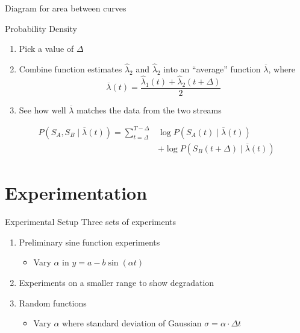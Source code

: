 \documentclass{beamer}
\begin{document}
\begin{frame}
  \begin{center}
    Diagram for area between curves
  \end{center}
\end{frame}

\begin{frame}{Probability Density}
  \begin{enumerate}
  \item Pick a value of $\Delta$
  \item Combine function estimates $\hat{\lambda}_2$ and $\hat{\lambda}_2$ into
    an ``average'' function $\overline{\lambda}$, where
    \[\overline{\lambda}(t)=\frac{\hat{\lambda}_1(t)+\hat{\lambda}_2(t+\Delta)}{2}\]
  \item See how well $\overline{\lambda}$ matches the data from the two streams
  \end{enumerate}
  \begin{align*}
      P(S_A,S_B\mid\overline{\lambda}(t))=\sum_{t=\Delta}^{T-\Delta}&\log P(S_A(t)\mid \overline{\lambda}(t))\\
      &+ \log P(S_B(t+\Delta)\mid \overline{\lambda}(t))
  \end{align*}

\end{frame}


\section{Experimentation}

\begin{frame}{Experimental Setup}
  Three sets of experiments
  \begin{enumerate}
  \item Preliminary sine function experiments
    \begin{itemize}
    \item Vary $\alpha$ in $y=a-b\sin(\alpha t)$
    \end{itemize}
  \item Experiments on a smaller range to show degradation
  \item Random functions
    \begin{itemize}
    \item Vary $\alpha$ where standard deviation of Gaussian $\sigma=\alpha\cdot\Delta t$
    \end{itemize}
  \end{enumerate}
\end{frame}
\end{document}
